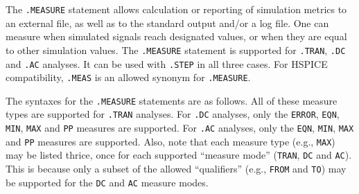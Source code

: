 


The \texttt{.MEASURE} statement allows calculation or reporting of simulation 
metrics to an external file, as well as to the standard output and/or a log file.  One can 
measure when simulated signals reach designated values, or when they are equal
to other simulation values.  The \texttt{.MEASURE} statement is supported for 
\texttt{.TRAN}, \texttt{.DC} and \texttt{.AC} analyses.  It can be used with {\tt .STEP} 
in all three cases.  For HSPICE compatibility, \texttt{.MEAS} is an allowed
synonym for \texttt{.MEASURE}.

The syntaxes for the \texttt{.MEASURE} statements are as follows.  All of these
measure types are supported for \texttt{.TRAN} analyses.  For \texttt{.DC} analyses,
only the \texttt{ERROR}, \texttt{EQN}, \texttt{MIN}, \texttt{MAX} and \texttt{PP} 
measures are supported.  For \texttt{.AC} analyses, only the \texttt{EQN}, 
\texttt{MIN}, \texttt{MAX} and \texttt{PP} measures are supported.  Also, note that 
each measure type (e.g., \texttt{MAX}) may be listed thrice, once for each supported
``measure mode'' (\texttt{TRAN}, \texttt{DC} and \texttt{AC}). This is because only 
a subset of the allowed ``qualifiers'' (e.g., \texttt{FROM} and \texttt{TO}) may be 
supported for the \texttt{DC} and \texttt{AC} measure modes. 

